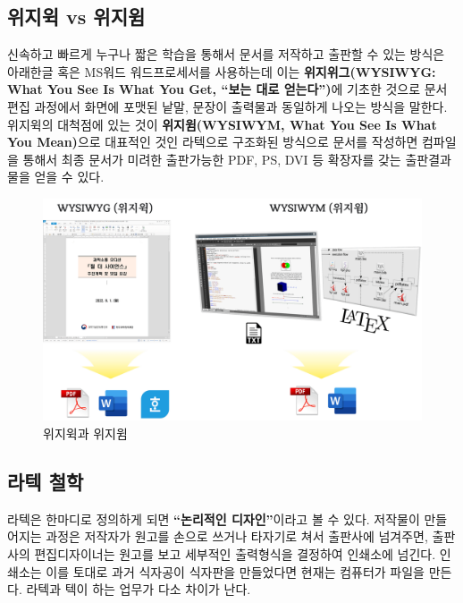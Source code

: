 \documentclass[
  letterpaper,
]{book}
\begin{document}
\hypertarget{uxc704uxc9c0uxc705-vs-uxc704uxc9c0uxc714}{%
\subsection{위지윅 vs
위지윔}\label{uxc704uxc9c0uxc705-vs-uxc704uxc9c0uxc714}}

신속하고 빠르게 누구나 짧은 학습을 통해서 문서를 저작하고 출판할 수 있는
방식은 아래한글 혹은 MS워드 워드프로세서를 사용하는데 이는
\textbf{위지위그(WYSIWYG: What You See Is What You Get, ``보는 대로
얻는다'')}에 기초한 것으로 문서 편집 과정에서 화면에 포맷된 낱말, 문장이
출력물과 동일하게 나오는 방식을 말한다. 위지윅의 대척점에 있는 것이
\textbf{위지윔(WYSIWYM, What You See Is What You Mean)}으로 대표적인
것인 라텍으로 구조화된 방식으로 문서를 작성하면 컴파일을 통해서 최종
문서가 미려한 출판가능한 PDF, PS, DVI 등 확장자를 갖는 출판결과물을 얻을
수 있다.

\begin{figure}

{\centering \includegraphics{images/two-paradigms.png}

}

\caption{위지윅과 위지윔}

\end{figure}

\hypertarget{latex-philosophy}{%
\subsection{라텍 철학}\label{latex-philosophy}}

라텍은 한마디로 정의하게 되면 \textbf{``논리적인 디자인''}이라고 볼 수
있다. 저작물이 만들어지는 과정은 저작자가 원고를 손으로 쓰거나 타자기로
쳐서 출판사에 넘겨주면, 출판사의 편집디자이너는 원고를 보고 세부적인
출력형식을 결정하여 인쇄소에 넘긴다. 인쇄소는 이를 토대로 과거 식자공이
식자판을 만들었다면 현재는 컴퓨터가 파일을 만든다. 라텍과 텍이 하는
업무가 다소 차이가 난다. \autocite{kim2017tex}
\end{document}
